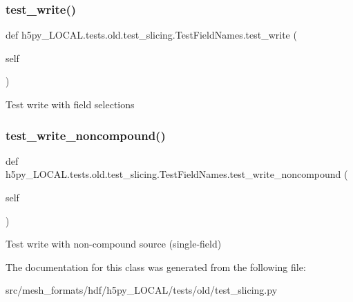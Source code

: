 \subsubsection{\texorpdfstring{test\+\_\+write()}{test\_write()}}
{\footnotesize\ttfamily def h5py\+\_\+\+L\+O\+C\+A\+L.\+tests.\+old.\+test\+\_\+slicing.\+Test\+Field\+Names.\+test\+\_\+write (\begin{DoxyParamCaption}\item[{}]{self }\end{DoxyParamCaption})}

\begin{DoxyVerb}Test write with field selections \end{DoxyVerb}
 \mbox{\label{classh5py__LOCAL_1_1tests_1_1old_1_1test__slicing_1_1TestFieldNames_a717b4f180bd8e379423702cd05dbfa4e}} 
\subsubsection{\texorpdfstring{test\+\_\+write\+\_\+noncompound()}{test\_write\_noncompound()}}
{\footnotesize\ttfamily def h5py\+\_\+\+L\+O\+C\+A\+L.\+tests.\+old.\+test\+\_\+slicing.\+Test\+Field\+Names.\+test\+\_\+write\+\_\+noncompound (\begin{DoxyParamCaption}\item[{}]{self }\end{DoxyParamCaption})}

\begin{DoxyVerb}Test write with non-compound source (single-field) \end{DoxyVerb}
 

The documentation for this class was generated from the following file\+:\begin{DoxyCompactItemize}
\item 
src/mesh\+\_\+formats/hdf/h5py\+\_\+\+L\+O\+C\+A\+L/tests/old/test\+\_\+slicing.\+py\end{DoxyCompactItemize}
